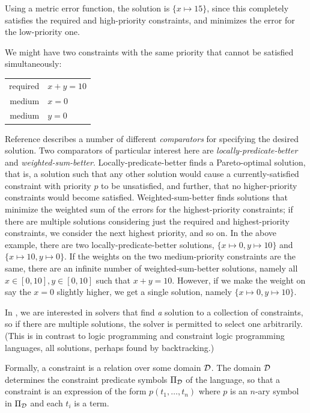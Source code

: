Using a metric error function, the solution is $\{x \mapsto 15\}$,
since this completely satisfies the required and high-priority
constraints, and minimizes the error for the low-priority one.

We might have two constraints with the same priority that cannot be
satisfied simultaneously:

\begin{center}
\begin{tabular}{rl}
required &     $x+y=10$ \\
medium   &     $x=0$ \\
medium   &     $y=0$
\end{tabular}
\end{center}

Reference \cite{borning-lisp-symbolic-computation-1992} describes a
number of different \emph{comparators} for specifying the desired
solution.  Two comparators of particular interest here are
\emph{locally-predicate-better} and \emph{weighted-sum-better}.
Locally-predicate-better finds a Pareto-optimal solution, that is, a
solution such that any other solution would cause a
currently-satisfied constraint with priority $p$ to be unsatisfied,
and further, that no higher-priority constraints would become
satisfied.  Weighted-sum-better finds solutions that minimize the
weighted sum of the errors for the highest-priority constraints; if
there are multiple solutions considering just the required and
highest-priority constraints, we consider the next highest priority,
and so on.  In the above example, there are two
locally-predicate-better solutions, $\{x \mapsto 0, y \mapsto 10\}$
and $\{x \mapsto 10, y \mapsto 0\}$.  If the weights on the two
medium-priority constraints are the same, there are an infinite number
of weighted-sum-better solutions, namely all $x \in [0,10], y \in
[0,10]$ such that $x+y=10$.  However, if we make the weight on say the
$x=0$ slightly higher, we get a single solution, namely $\{x \mapsto
0, y \mapsto 10\}$.

In \langname, we are interested in solvers that find \emph{a} solution
to a collection of constraints, so if there are multiple solutions,
the solver is permitted to select one arbitrarily.  (This is in
contrast to logic programming and constraint logic programming
languages, \DIFdelbegin {}\DIFdelend \DIFaddbegin {}\DIFaddend all solutions, perhaps
found by backtracking.)

Formally, a constraint is a relation over some domain $\cal D$\@.  The
domain $\cal D$ determines the constraint predicate symbols $\Pi_{\cal
  D}$ of the language, so that a constraint is an expression of the
form $p(t_{1} , \ldots , t_{n} )$ where $p$ is an $n$-ary symbol in
$\Pi_{\cal D}$ and each $t_{i}$ is a term.

